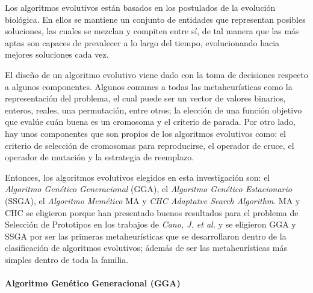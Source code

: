 Los algoritmos evolutivos \cite{talbi2009metaheuristics} están basados en los postulados de la evolución biológica. En ellos se mantiene un conjunto de entidades que representan posibles soluciones, las cuales se mezclan y compiten entre sí, de tal manera que las más aptas son capaces de prevalecer a lo largo del tiempo, evolucionando hacia mejores soluciones cada vez.

El diseño de un algoritmo evolutivo viene dado con la toma de decisiones respecto a algunos componentes. Algunos comunes a todas las metaheurísticas como la representación del problema, el cual puede ser un vector de valores binarios, enteros, reales, una permutación, entre otros; la elección de una función objetivo que evalúe cuán buena es un cromosoma y el criterio de parada. Por otro lado, hay unos componentes que son propios de los algoritmos evolutivos como: el criterio de selección de cromosomas para reproducirse, el operador de cruce, el operador de mutación y la estrategia de reemplazo.


Entonces, los algoritmos evolutivos elegidos en esta investigación son: el \emph{Algoritmo Genético Generacional} (GGA), el \emph{Algoritmo Genético Estacionario} (SSGA), el \emph{Algoritmo Memético} MA y \emph{CHC Adaptatve Search Algorithm}. MA y CHC se eligieron porque han presentado buenos resultados para el problema de Selección de Prototipos en los trabajos de \emph{Cano, J. et al.} \cite{garcia2012prototype, garcia2008memetic} y se eligieron GGA y SSGA por ser las primeras metaheurísticas que se desarrollaron dentro de la clasificación de algoritmos evolutivos; ádemás de ser las metaheurísticas más simples dentro de toda la familia.

\paragraph{Algoritmo Genético Generacional (GGA)}

